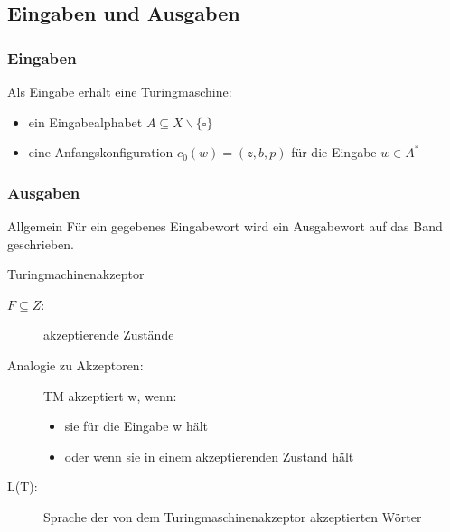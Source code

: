 \subsection{Eingaben und Ausgaben}
\begin{frame}
	\frametitle{Eingaben}
	Als Eingabe erhält eine Turingmaschine:
	\begin{itemize}
		\item ein Eingabealphabet $A\subseteq X\backslash\{\square\}$
		\item eine Anfangskonfiguration $c_0(w)=(z,b,p)$ für die Eingabe $w\in A^*$
	\end{itemize}
\end{frame}
\begin{frame}
	\frametitle{Ausgaben}
	\begin{block}{Allgemein}
		Für ein gegebenes Eingabewort wird ein Ausgabewort auf das Band geschrieben.
	\end{block}
	\begin{block}{Turingmachinenakzeptor}
		\begin{description}
			\item[$F\subseteq Z$:] akzeptierende Zustände
			\item[Analogie zu Akzeptoren:] TM akzeptiert w, wenn:
			\begin{itemize}
				\item sie für die Eingabe w hält
				\item oder wenn sie in einem akzeptierenden Zustand hält
			\end{itemize}
			\item[L(T):] Sprache der von dem Turingmaschinenakzeptor akzeptierten Wörter
		\end{description}
	\end{block}
\end{frame}

